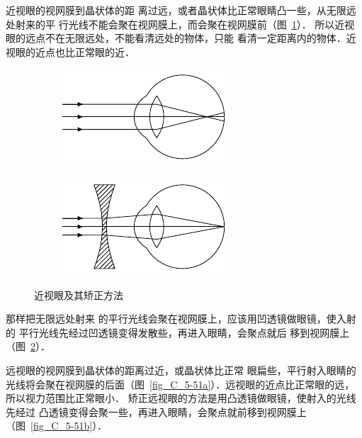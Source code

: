 近视眼的视网膜到晶状体的距
离过远，或者晶状体比正常眼睛凸一些，从无限远处射来的平
行光线不能会聚在视网膜上，而会聚在视网膜前（图~\ref{fig_C_5-50a}）．
所以近视眼的远点不在无限远处，不能看清远处的物体，只能
看清一定距离内的物体．近视眼的近点也比正常眼的近．
\begin{figure}[htbp]
    \centering
    \begin{subfigure}{0.4\linewidth}
        \centering
        \includegraphics{fig/C/5-50a.pdf}
        \caption{}\label{fig_C_5-50a}
    \end{subfigure}
    \hfil
    \begin{subfigure}{0.4\linewidth}
        \centering
        \includegraphics{fig/C/5-50b.pdf}
        \caption{}\label{fig_C_5-50b}
    \end{subfigure}
    \caption{近视眼及其矫正方法}\label{fig_C_5-50}
\end{figure}

那样把无限远处射来
的平行光线会聚在视网膜上，应该用凹透镜做眼镜，使入射的
平行光线先经过凹透镜变得发散些，再进入眼睛，会聚点就后
移到视网膜上（图~\ref{fig_C_5-50b}）．

远视眼的视网膜到晶状体的距离过近，或晶状体比正常
眼扁些，平行射入眼睛的光线将会聚在视网膜的后面（图~\ref{fig_C_5-51a}）．远视眼的近点比正常眼的远，所以视力范围比正常眼小．
矫正远视眼的方法是用凸透镜做眼镜，使射入的光线先经过
凸透镜变得会聚一些，再进入眼睛，会聚点就前移到视网膜上（图~\ref{fig_C_5-51b}）．

